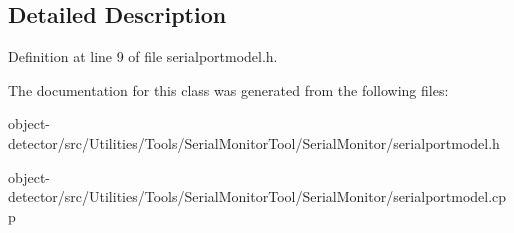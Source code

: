 \subsection{Detailed Description}


Definition at line 9 of file serialportmodel.\+h.



The documentation for this class was generated from the following files\+:\begin{DoxyCompactItemize}
\item 
object-\/detector/src/\+Utilities/\+Tools/\+Serial\+Monitor\+Tool/\+Serial\+Monitor/serialportmodel.\+h\item 
object-\/detector/src/\+Utilities/\+Tools/\+Serial\+Monitor\+Tool/\+Serial\+Monitor/serialportmodel.\+cpp\end{DoxyCompactItemize}
